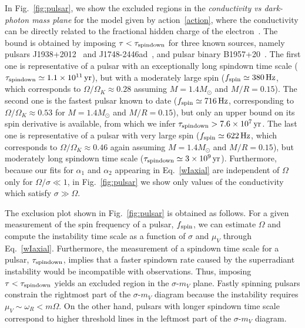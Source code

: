 \documentclass[11pt]{article}
\numberwithin{equation}{section} %
\begin{document}
In Fig.~\ref{fig:pulsar}, we show the excluded regions in the \emph{conductivity vs dark-photon mass plane} for the model given by action~\eqref{action}, where the conductivity can be directly related to the fractional hidden charge of the electron~\cite{Cardoso:2017kgn}.
The bound is obtained by imposing $\tau<\tau_{\rm spindown}$ for three known sources, namely pulsars J1938+2012~\cite{Stovall:2016unz} and J1748-2446ad~\cite{Hessels:2006ze}, and pulsar binary B1957+20~\cite{Arzoumanian:1993qt}. The first one is representative of a pulsar with an exceptionally long spindown time scale ($\tau_{\rm spindown}\simeq1.1\times 10^{11}\,{\rm yr}$), but with a moderately large spin ($f_{\rm spin}\simeq 380\,{\rm Hz}$, which corresponds to $\Omega/\Omega_K\approx0.28$ assuming $M=1.4 M_\odot$ and $M/R=0.15$). 
%
The second one is the fastest pulsar known to date ($f_{\rm spin}\simeq 716\,{\rm Hz}$, corresponding to $\Omega/\Omega_K\approx0.53$ for $M=1.4 M_\odot$ and $M/R=0.15$), but only an upper bound on its spin derivative is available, from which we infer $\tau_{\rm spindown}>7.6\times 10^7\,{\rm yr}$.
%
The last one is representative of a pulsar with very large spin ($f_{\rm spin}\simeq 622\,{\rm Hz}$, which corresponds to $\Omega/\Omega_K\approx0.46$ again assuming $M=1.4 M_\odot$ and $M/R=0.15$), but moderately long spindown time scale ($\tau_{\rm spindown}\simeq3\times 10^{9}\,{\rm yr}$).
%
Furthermore, because our fits for $\alpha_1$ and $\alpha_2$ appearing in Eq.~\eqref{wIaxial} are independent of $\Omega$ only for $\Omega/\sigma\ll1$, in Fig.~\ref{fig:pulsar} we show only values of the conductivity which satisfy $\sigma\gg \Omega$. 

The exclusion plot shown in Fig.~\ref{fig:pulsar} is obtained as follows.
For a given measurement of the spin frequency of a pulsar, $f_{\rm spin}$, we can estimate $\Omega$ and compute the instability time scale as a function of $\sigma$ and $\mu_V$ through Eq.~\eqref{wIaxial}. Furthermore, the measurement of a spindown time scale for a pulsar, $\tau_{\rm spindown}$, implies that a faster spindown rate caused by the superradiant instability would be incompatible with observations.
Thus, imposing $\tau<\tau_{\rm spindown}$ yields an excluded region in the $\sigma$-$m_V$ plane. Fastly spinning pulsars constrain the rightmost part of the $\sigma$-$m_V$ diagram because the instability requires $\mu_V\sim\omega_R <m\Omega$. On the other hand, pulsars with longer spindown time scale correspond to higher threshold lines in the leftmost part of the $\sigma$-$m_V$ diagram.
\end{document}
